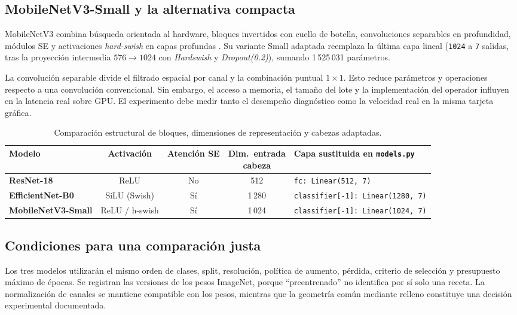 \subsection{MobileNetV3-Small y la alternativa compacta}
MobileNetV3 combina búsqueda orientada al hardware, bloques invertidos con cuello de botella, convoluciones separables en profundidad, módulos SE y activaciones \textit{hard-swish} en capas profundas \cite{howard2019}. Su variante Small adaptada reemplaza la última capa lineal (\texttt{1024} a \texttt{7} salidas, tras la proyección intermedia $576\to 1024$ con \textit{Hardswish} y \textit{Dropout(0.2)}), sumando 1\,525\,031 parámetros.

La convolución separable divide el filtrado espacial por canal y la combinación puntual $1\times 1$. Esto reduce parámetros y operaciones respecto a una convolución convencional. Sin embargo, el acceso a memoria, el tamaño del lote y la implementación del operador influyen en la latencia real sobre GPU. El experimento debe medir tanto el desempeño diagnóstico como la velocidad real en la misma tarjeta gráfica.



\begin{table}[htbp]\centering\footnotesize
\setlength{\tabcolsep}{4.5pt}
\caption{Comparación estructural de bloques, dimensiones de representación y cabezas adaptadas.}
\begin{tabularx}{\textwidth}{@{}>{\bfseries}lccc>{\raggedright\arraybackslash}X@{}}
\toprule
\textbf{Modelo} & \textbf{Activación} & \textbf{Atención SE} & \makecell{\textbf{Dim.\ entrada}\\\textbf{cabeza}} & \textbf{Capa sustituida en \texttt{models.py}} \\ \midrule
ResNet-18 & ReLU & No & 512 & \texttt{fc: Linear(512, 7)} \\
EfficientNet-B0 & SiLU (Swish) & Sí & 1\,280 & \texttt{classifier[-1]: Linear(1280, 7)} \\
MobileNetV3-Small & ReLU / h-swish & Sí & 1\,024 & \texttt{classifier[-1]: Linear(1024, 7)} \\
\bottomrule
\end{tabularx}
\end{table}

\FloatBarrier

\subsection{Condiciones para una comparación justa}
Los tres modelos utilizarán el mismo orden de clases, split, resolución, política de aumento, pérdida, criterio de selección y presupuesto máximo de épocas. Se registran las versiones de los pesos ImageNet, porque ``preentrenado'' no identifica por sí solo una receta. La normalización de canales se mantiene compatible con los pesos, mientras que la geometría común mediante relleno constituye una decisión experimental documentada.

